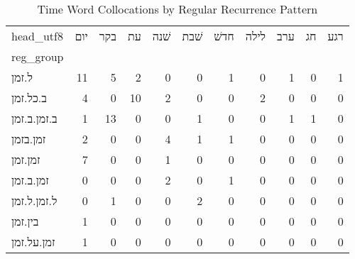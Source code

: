 \begin{table}[htbp!]
\centering
\caption{Time Word Collocations by Regular Recurrence Pattern}
\label{table:regrechead_ct}
\begin{tabular}{lrrrrrrrrrr}
\toprule
head\_utf8 &  יום &  בקר &  עת &  שׁנה &  שׁבת &  חדשׁ &  לילה &  ערב &  חג &  רגע \\
reg\_group   &      &      &     &       &       &       &       &      &     &      \\
\midrule
ל.זמן       &   11 &    5 &   2 &     0 &     0 &     1 &     0 &    1 &   0 &    1 \\
ב.כל.זמן    &    4 &    0 &  10 &     2 &     0 &     0 &     2 &    0 &   0 &    0 \\
ב.זמן.ב.זמן &    1 &   13 &   0 &     0 &     1 &     0 &     0 &    1 &   1 &    0 \\
זמן.בזמן    &    2 &    0 &   0 &     4 &     1 &     1 &     0 &    0 &   0 &    0 \\
זמן.זמן     &    7 &    0 &   0 &     1 &     0 &     0 &     0 &    0 &   0 &    0 \\
זמן.ב.זמן   &    0 &    0 &   0 &     2 &     0 &     1 &     0 &    0 &   0 &    0 \\
ל.זמן.ל.זמן &    0 &    1 &   0 &     0 &     2 &     0 &     0 &    0 &   0 &    0 \\
בין.זמן     &    1 &    0 &   0 &     0 &     0 &     0 &     0 &    0 &   0 &    0 \\
זמן.על.זמן  &    1 &    0 &   0 &     0 &     0 &     0 &     0 &    0 &   0 &    0 \\
\bottomrule
\end{tabular}
\end{table}
